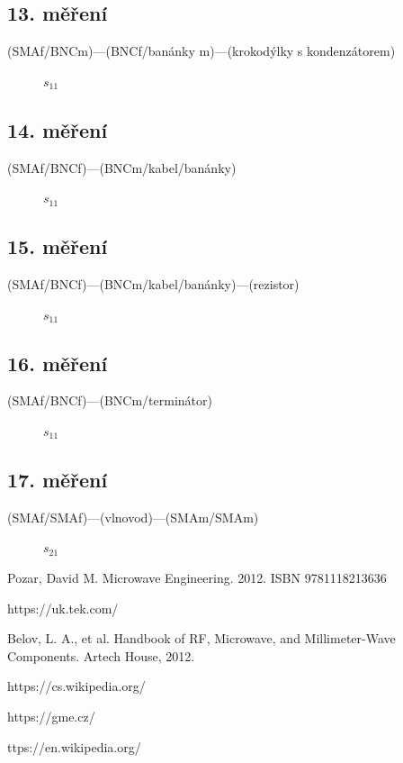 \documentclass{protokol}
\begin{document}
\subsection{13. měření}
(SMAf/BNCm)---(BNCf/banánky m)---(krokodýlky s kondenzátorem)

\begin{figure}[htp]
	\centering
	
	\caption{$s_{11}$}
	\label{fig:13-s11}
\end{figure}

\subsection{14. měření}
(SMAf/BNCf)---(BNCm/kabel/banánky)

\begin{figure}[htp]
	\centering
	
	\caption{$s_{11}$}
	\label{fig:14-s11}
\end{figure}

\subsection{15. měření}
(SMAf/BNCf)---(BNCm/kabel/banánky)---(rezistor)

\begin{figure}[htp]
	\centering
	
	\caption{$s_{11}$}
	\label{fig:15-s11}
\end{figure}

\subsection{16. měření}
(SMAf/BNCf)---(BNCm/terminátor)

\begin{figure}[htp]
	\centering
	
	\caption{$s_{11}$}
	\label{fig:16-s11}
\end{figure}

\subsection{17. měření}
(SMAf/SMAf)---(vlnovod)---(SMAm/SMAm)

\begin{figure}[htp]
	\centering
	
	\caption{$s_{21}$}
	\label{fig:17-s21}
\end{figure}

\newpage
\begin{thebibliography}{}

	Pozar, David M. Microwave Engineering. 2012. ISBN 9781118213636

	https://uk.tek.com/

	Belov, L. A., et al. Handbook of RF, Microwave, and Millimeter-Wave Components. Artech House, 2012.

	https://cs.wikipedia.org/

	https://gme.cz/

	ttps://en.wikipedia.org/

\end{thebibliography}
\end{document}
